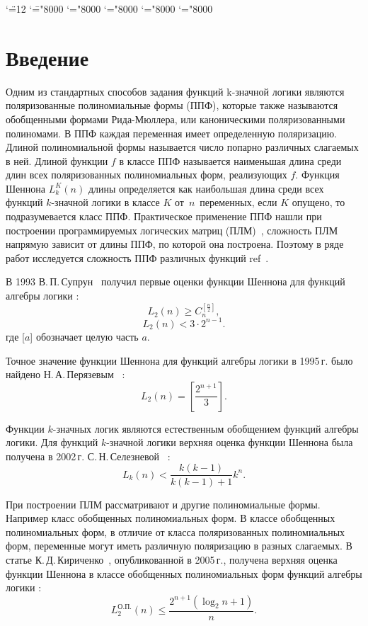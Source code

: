 \documentclass[bibliography=totoc, a4paper, 14pt]{extarticle}
\let\stdsection\section
\renewcommand\section{\newpage\stdsection}
\begin{document}
\begingroup \catcode`\"=12
\gdef\newmcodes@{\mathcode`\'39\mathcode`\*42\mathcode`\."613A%
\mathcode`\-"8000\mathcode`\/47\mathcode`\:"603A\relax}%
\endgroup
\mathcode`\=="8000 \mathcode`\+="8000 \mathcode`\-="8000
\mathcode`\<="8000 \mathcode`\>="8000


\setcounter{page}{2}
\setcounter{secnumdepth}{-1}

\tableofcontents

\section{Введение}
Одним из стандартных способов задания функций k\nobreakdash-значной логики являются поляризованные
полиномиальные формы (ППФ), которые также называются обобщенными формами Рида-Мюллера, или
каноническими поляризованными полиномами. В ППФ каждая переменная имеет определенную поляризацию.
Длиной полиномиальной формы называется число попарно различных слагаемых в ней. Длиной функции $f$
в классе ППФ называется наименьшая длина среди длин всех поляризованных полиномиальных форм,
реализующих $f$. Функция Шеннона $L^K_k(n)$ длины определяется как наибольшая длина среди всех
функций $k$\nobreakdash-значной логики в классе $K$ от~$n$~переменных, если $K$ опущено, то
подразумевается класс ППФ. Практическое применение ППФ нашли при построении программируемых
логических матриц (ПЛМ)~\cite{ue04, sb90}, сложность ПЛМ напрямую зависит от длины ППФ, по которой
она построена. Поэтому в ряде работ исследуется сложность ППФ различных функций
ref~\cite{sv93,pn95,ss02,kk05,sd08,mn12,sm09}.

В 1993  В.\,П.\,Супрун~\cite{sv93} получил первые оценки функции Шеннона для функций алгебры логики :
$$
L_2(n) \geqslant C_n^{[\frac{n}{2}]},
$$
$$
L_2(n) < 3 \cdot 2^{n-1}.
$$
где [$a$] обозначает целую часть $a$.

Точное значение функции Шеннона для функций алгебры логики в 1995\,г. было
найдено Н.\,А.\,Перязевым~\cite{pn95} :
$$
L_2(n) = \left[\frac{2^{n+1}}{3}\right].
$$

Функции $k$\nobreakdash-значных логик являются естественным обобщением функций алгебры логики.
Для функций $k$\nobreakdash-значной логики верхняя оценка функции Шеннона была получена в 2002\,г. С.\,Н.\,Селезневой~\cite{ss02} :
$$
L_k(n) < \frac{k(k-1)}{k(k-1)+1}k^n.
$$

При построении ПЛМ рассматривают и другие полиномиальные формы. Например класс обобщенных полиномиальных форм.
В классе обобщенных полиномиальных форм, в отличие от класса поляризованных полиномиальных форм, переменные могут иметь
различную поляризацию в разных слагаемых. В статье К.\,Д.\,Кириченко~\cite{kk05}, опубликованной в 2005\,г., получена верхняя оценка
функции Шеннона в классе обобщенных полиномиальных форм функций алгебры логики :
$$
L^{\text{О.П.}}_2(n) \leqslant \frac{2 ^ {n + 1}(\log_2n+1)}{n}.
$$
\end{document}
